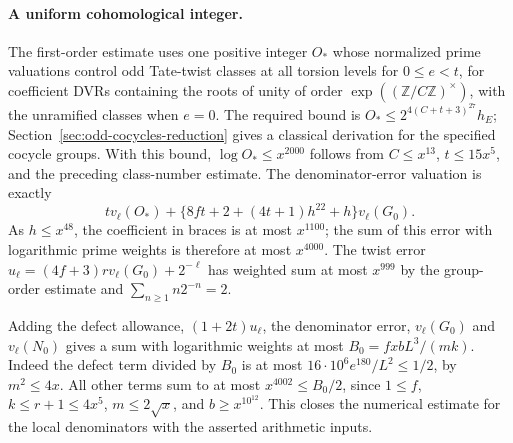 \paragraph{A uniform cohomological integer.}
The first-order estimate uses one positive integer \(O_*\) whose
normalized prime valuations control odd Tate-twist classes at all
torsion levels for \(0\le e<t\), for coefficient DVRs containing the roots of unity of order \(\exp((\mathbb Z/C\mathbb Z)^\times)\), with the unramified classes when
\(e=0\). The required bound is
\(O_*\le 2^{4(C+t+3)^{27}}h_E\); Section~\ref{sec:odd-cocycles-reduction} gives a classical derivation for the specified cocycle groups. With this bound, \(\log O_*\le x^{2000}\)
follows from \(C\le x^{13}\), \(t\le15x^5\), and the preceding
class-number estimate. The denominator-error valuation is exactly
\[
 t v_\ell(O_*)+
 \{8ft+2+(4t+1)h^{22}+h\}v_\ell(G_0).
\]
As \(h\le x^{48}\), the coefficient in braces is at most \(x^{1100}\);
the sum of this error with logarithmic prime weights is therefore
at most \(x^{4000}\). The twist error
\(u_\ell=(4f+3)r v_\ell(G_0)+2^{-\ell}\) has weighted sum
at most \(x^{999}\) by the group-order estimate and
\(\sum_{n\ge1} n2^{-n}=2\).

Adding the defect allowance, \((1+2t)u_\ell\), the denominator
error, \(v_\ell(G_0)\) and \(v_\ell(N_0)\) gives a sum with
logarithmic weights at most \(B_0=fxbL^3/(mk)\).
Indeed the defect term divided by \(B_0\) is at most
\(16\cdot10^6e^{180}/L^2\le 1/2\), by \(m^2\le4x\).
All other terms sum to at most \(x^{4002}\le B_0/2\), since
\(1\le f\), \(k\le r+1\le4x^5\), \(m\le2\sqrt{x}\), and
\(b\ge x^{10^{12}}\). This closes the numerical estimate for
the local denominators with the asserted arithmetic inputs.


